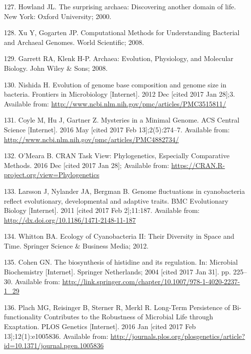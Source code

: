 \documentclass[12pt,twoside]{reedthesis}
\begin{document}
  \hypertarget{ref-howland_surprising_2000}{}
  127. Howland JL. The surprising archaea: Discovering another domain of
  life. New York: Oxford University; 2000.
  
  \hypertarget{ref-xu_computational_2008}{}
  128. Xu Y, Gogarten JP. Computational Methods for Understanding
  Bacterial and Archaeal Genomes. World Scientific; 2008.
  
  \hypertarget{ref-garrett_archaea_2008}{}
  129. Garrett RA, Klenk H-P. Archaea: Evolution, Physiology, and
  Molecular Biology. John Wiley \& Sons; 2008.
  
  \hypertarget{ref-nishida_evolution_2012}{}
  130. Nishida H. Evolution of genome base composition and genome size in
  bacteria. Frontiers in Microbiology {[}Internet{]}. 2012 Dec {[}cited
  2017 Jan 28{]};3. Available from:
  \url{http://www.ncbi.nlm.nih.gov/pmc/articles/PMC3515811/}
  
  \hypertarget{ref-coyle_mysteries_2016}{}
  131. Coyle M, Hu J, Gartner Z. Mysteries in a Minimal Genome. ACS
  Central Science {[}Internet{]}. 2016 May {[}cited 2017 Feb
  13{]};2(5):274--7. Available from:
  \url{http://www.ncbi.nlm.nih.gov/pmc/articles/PMC4882734/}
  
  \hypertarget{ref-omeara_cran_2016}{}
  132. O'Meara B. CRAN Task View: Phylogenetics, Especially Comparative
  Methods. 2016 Dec {[}cited 2017 Jan 28{]}; Available from:
  \url{https://CRAN.R-project.org/view=Phylogenetics}
  
  \hypertarget{ref-larsson_genome_2011}{}
  133. Larsson J, Nylander JA, Bergman B. Genome fluctuations in
  cyanobacteria reflect evolutionary, developmental and adaptive traits.
  BMC Evolutionary Biology {[}Internet{]}. 2011 {[}cited 2017 Feb
  2{]};11:187. Available from:
  \url{http://dx.doi.org/10.1186/1471-2148-11-187}
  
  \hypertarget{ref-whitton_ecology_2012}{}
  134. Whitton BA. Ecology of Cyanobacteria II: Their Diversity in Space
  and Time. Springer Science \& Business Media; 2012.
  
  \hypertarget{ref-cohen_biosynthesis_2004}{}
  135. Cohen GN. The biosynthesis of histidine and its regulation. In:
  Microbial Biochemistry {[}Internet{]}. Springer Netherlands; 2004
  {[}cited 2017 Jan 31{]}. pp. 225--30. Available from:
  \url{http://link.springer.com/chapter/10.1007/978-1-4020-2237-1_29}
  
  \hypertarget{ref-plach_long-term_2016}{}
  136. Plach MG, Reisinger B, Sterner R, Merkl R. Long-Term Persistence of
  Bi-functionality Contributes to the Robustness of Microbial Life through
  Exaptation. PLOS Genetics {[}Internet{]}. 2016 Jan {[}cited 2017 Feb
  13{]};12(1):e1005836. Available from:
  \url{http://journals.plos.org/plosgenetics/article?id=10.1371/journal.pgen.1005836}
  
\end{document}
